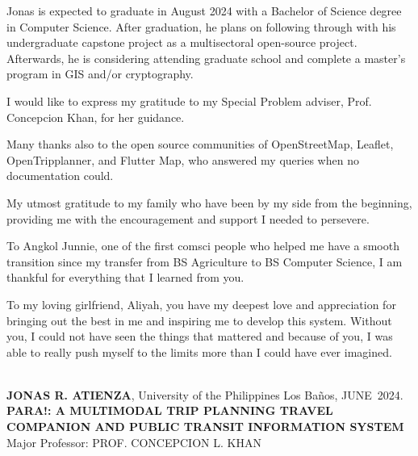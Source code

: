 \documentclass{icsthesis}
\renewcommand{\TITLE}{PARA!: A MULTIMODAL TRIP PLANNING TRAVEL COMPANION AND PUBLIC TRANSIT INFORMATION SYSTEM}
\renewcommand{\AUTHOR}{JONAS R. ATIENZA}
\renewcommand{\MONTH}{JUNE}
\renewcommand{\YEAR}{2024}
\begin{document}
\begin{frontmatter}
\begin{biosketch}
            Jonas is expected to graduate in August 2024 with a Bachelor of Science degree in Computer Science.
            After graduation, he plans on following through with his undergraduate capstone project as a multisectoral open-source project.
            Afterwards, he is considering attending graduate school and complete a master's program in GIS and/or cryptography.
			\addauthorsignaturefield
		\end{biosketch}	
		
		\begin{acknowledgement}
			I would like to express my gratitude to my Special Problem adviser, Prof. Concepcion Khan, for her guidance.
           
            Many thanks also to the open source communities of OpenStreetMap, Leaflet, \\ OpenTripplanner, and Flutter Map, who answered my queries when no documentation could.

            My utmost gratitude to my family who have been by my side from the beginning, providing me with the encouragement and support I needed to persevere.
        
            To Angkol Junnie, one of the first comsci people who helped me have a smooth transition since my transfer from BS Agriculture to BS Computer Science, I am thankful for everything that I learned from you.

            To my loving girlfriend, Aliyah, you have my deepest love and appreciation for bringing out the best in me and inspiring me to develop this system. Without you, I could not have seen the things that mattered and because of you, I was able to really push myself to the limits more than I could have ever imagined.

		\end{acknowledgement}
		
		\maketableofcontents
		

		\makelistoffigures
	
		
		\begin{abstractwithpageno}	
		\\
		\textbf{\AUTHOR}, University of the Philippines Los Ba\~{n}os, \MONTH\ \YEAR. \textbf{\TITLE}
		\\Major Professor: PROF. CONCEPCION L. KHAN\\
			

\end{abstractwithpageno}
\end{frontmatter}
\end{document}
